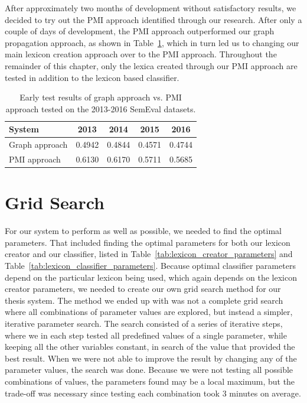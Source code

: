 After approximately two months of development without satisfactory results, we decided to try out the PMI approach identified through our research. After only a couple of days of development, the PMI approach outperformed our graph propagation approach, as shown in Table~\ref{tab:graph_vs_pmi}, which in turn led us to changing our main lexicon creation approach over to the PMI approach. Throughout the remainder of this chapter, only the lexica created through our PMI approach are tested in addition to the lexicon based classifier.

\begin{table}[t]
    \centering
    \begin{tabular}{|l|c|c|c|c|}
        \hline
        \textbf{System} & \textbf{2013} & \textbf{2014} & \textbf{2015} & \textbf{2016} \\ \hline
        Graph approach  & 0.4942 & 0.4844 & 0.4571 & 0.4744 \\ \hline
        PMI approach    & 0.6130 & 0.6170 & 0.5711 & 0.5685 \\ \hline
    \end{tabular}
    \caption[Early results of graph approach vs. PMI approach]{Early test results of graph approach vs. PMI approach tested on the 2013-2016 SemEval datasets.}
    \label{tab:graph_vs_pmi}   
\end{table}

\section{Grid Search}
\label{sec:grid_search}
For our system to perform as well as possible, we needed to find the optimal parameters. That included finding the optimal parameters for both our lexicon creator and our classifier, listed in Table~\ref{tab:lexicon_creator_parameters} and Table~\ref{tab:lexicon_classifier_parameters}. Because optimal classifier parameters depend on the particular lexicon being used, which again depends on the lexicon creator parameters, we needed to create our own grid search method for our thesis system. The method we ended up with was not a complete grid search where all combinations of parameter values are explored, but instead a simpler, iterative parameter search. The search consisted of a series of iterative steps, where we in each step tested all predefined values of a single parameter, while keeping all the other variables constant, in search of the value that provided the best result. When we were not able to improve the result by changing any of the parameter values, the search was done. Because we were not testing all possible combinations of values, the parameters found may be a local maximum, but the trade-off was necessary since testing each combination took 3 minutes on average.

